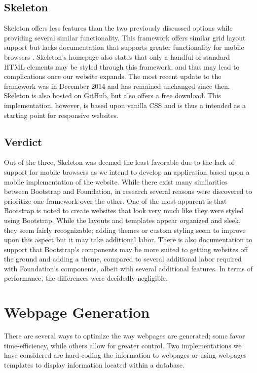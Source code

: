 \documentclass[letterpaper,10pt, draftclsnofoot,onecolumn]{IEEEtran}
\begin{document}
{{{{{{{{{{{\subsection[Skeleton]{\color{black}
Skeleton}
{\color{black}\normalsize\noindent
{Skeleton offers less features than the two previously discussed options while providing several similar functionality. 
This framework offers similar grid layout support but lacks documentation that supports greater functionality for mobile browsers \cite{website2}.
Skeleton’s homepage also states that only a handful of standard HTML elements may be styled through this framework, and thus may lead to complications once our website expands.
The most recent update to the framework was in December 2014 and has remained unchanged since then. Skeleton is also hosted on GitHub, but also offers a free download. 
This implementation, however, is based upon vanilla CSS and is thus a intended as a starting point for responsive websites.}
 
\subsection[Verdict]{\color{black}
Verdict}
{\color{black}\normalsize\noindent
{Out of the three, Skeleton was deemed the least favorable due to the lack of support for mobile browsers as we intend to develop an application based upon a mobile implementation of the website. 
While there exist many similarities between Bootstrap and Foundation, in research several reasons were discovered to prioritize one framework over the other.
One of the most apparent is that Bootstrap is noted to create websites that look very much like they were styled using Bootstrap. 
While the layouts and templates appear organized and sleek, they seem fairly recognizable; adding themes or custom styling seem to improve upon this aspect but it may take additional labor. 
There is also documentation to support that Bootstrap’s components may be more suited to getting websites off the ground and adding a theme, compared to several additional labor required with Foundation’s components, albeit with several additional features. 
In terms of performance, the differences were decidedly negligible.}

\section[Webpage Generation]{\color{black}
Webpage Generation}
{\color{black}\normalsize\noindent
{There are several ways to optimize the way webpages are generated; some favor time-efficiency, while others allow for greater control. Two implementations we have considered are hard-coding the information to webpages or using webpages templates to display information located within a database. }

}}}}}}}}}}}}}}
\end{document}

